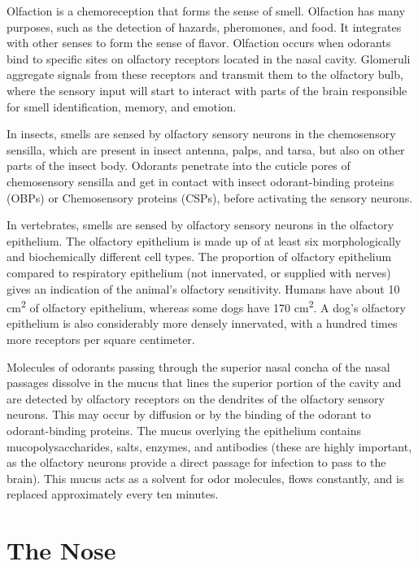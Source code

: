 \documentclass[]{book}
\begin{document}
Olfaction is a chemoreception that forms the sense of smell. Olfaction has many purposes, such as the detection of hazards, pheromones, and food. It integrates with other senses to form the sense of flavor. Olfaction occurs when odorants bind to specific sites on olfactory receptors located in the nasal cavity. Glomeruli aggregate signals from these receptors and transmit them to the olfactory bulb, where the sensory input will start to interact with parts of the brain responsible for smell identification, memory, and emotion.

In insects, smells are sensed by olfactory sensory neurons in the chemosensory sensilla, which are present in insect antenna, palps, and tarsa, but also on other parts of the insect body. Odorants penetrate into the cuticle pores of chemosensory sensilla and get in contact with insect odorant-binding proteins (OBPs) or Chemosensory proteins (CSPs), before activating the sensory neurons.

In vertebrates, smells are sensed by olfactory sensory neurons in the olfactory epithelium. The olfactory epithelium is made up of at least six morphologically and biochemically different cell types. The proportion of olfactory epithelium compared to respiratory epithelium (not innervated, or supplied with nerves) gives an indication of the animal's olfactory sensitivity. Humans have about 10 cm\textsuperscript{2} of olfactory epithelium, whereas some dogs have 170 cm\textsuperscript{2}. A dog's olfactory epithelium is also considerably more densely innervated, with a hundred times more receptors per square centimeter.

Molecules of odorants passing through the superior nasal concha of the nasal passages dissolve in the mucus that lines the superior portion of the cavity and are detected by olfactory receptors on the dendrites of the olfactory sensory neurons. This may occur by diffusion or by the binding of the odorant to odorant-binding proteins. The mucus overlying the epithelium contains mucopolysaccharides, salts, enzymes, and antibodies (these are highly important, as the olfactory neurons provide a direct passage for infection to pass to the brain). This mucus acts as a solvent for odor molecules, flows constantly, and is replaced approximately every ten minutes.

\hypertarget{the-nose}{%
\section{The Nose}\label{the-nose}}
\end{document}
